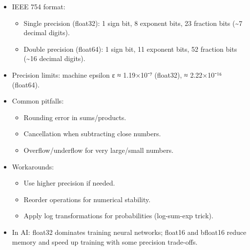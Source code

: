 \documentclass[
  letterpaper,
  DIV=11,
  numbers=noendperiod]{scrreprt}
\providecommand{\tightlist}{%
  \setlength{\itemsep}{0pt}\setlength{\parskip}{0pt}}
\begin{document}
\begin{itemize}
\item
  IEEE 754 format:

  \begin{itemize}
  \tightlist
  \item
    Single precision (float32): 1 sign bit, 8 exponent bits, 23 fraction
    bits (\textasciitilde7 decimal digits).
  \item
    Double precision (float64): 1 sign bit, 11 exponent bits, 52
    fraction bits (\textasciitilde16 decimal digits).
  \end{itemize}
\item
  Precision limits: machine epsilon ε ≈ 1.19×10⁻⁷ (float32), ≈
  2.22×10⁻¹⁶ (float64).
\item
  Common pitfalls:

  \begin{itemize}
  \tightlist
  \item
    Rounding error in sums/products.
  \item
    Cancellation when subtracting close numbers.
  \item
    Overflow/underflow for very large/small numbers.
  \end{itemize}
\item
  Workarounds:

  \begin{itemize}
  \tightlist
  \item
    Use higher precision if needed.
  \item
    Reorder operations for numerical stability.
  \item
    Apply log transformations for probabilities (log-sum-exp trick).
  \end{itemize}
\item
  In AI: float32 dominates training neural networks; float16 and
  bfloat16 reduce memory and speed up training with some precision
  trade-offs.
\end{itemize}
\end{document}
